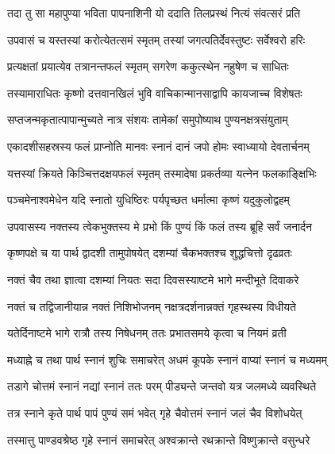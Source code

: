 \twolineshloka
{तदा तु सा महापुण्या भविता पापनाशिनी}
{यो ददाति तिलप्रस्थं नित्यं संवत्सरं प्रति}%

\twolineshloka
{उपवासं च यस्तस्यां करोत्येतत्समं स्मृतम्}
{तस्यां जगत्पतिर्देवस्तुष्टः सर्वेश्वरो हरिः}%

\twolineshloka
{प्रत्यक्षतां प्रयात्येव तत्रानन्तफलं स्मृतम्}
{सगरेण ककुत्स्थेन नहुषेण च साधितः}%

\twolineshloka
{तस्यामाराधितः कृष्णो दत्तवानखिलं भुवि}
{वाचिकान्मानसाद्वापि कायजाच्च विशेषतः}%

\twolineshloka
{सप्तजन्मकृतात्पापान्मुच्यते नात्र संशयः}
{तामेकां समुपोष्याथ पुण्यनक्षत्रसंयुताम्}%

\twolineshloka
{एकादशीसहस्रस्य फलं प्राप्नोति मानवः}
{स्नानं दानं जपो होमः स्वाध्यायो देवतार्चनम्}%

\twolineshloka
{यत्तस्यां क्रियते किञ्चित्तदक्षयफलं स्मृतम्}
{तस्मादेषा प्रकर्तव्या यत्नेन फलकाङ्क्षिभिः}%

\twolineshloka
{पञ्चमेनाश्वमेधेन यदि स्नातो युधिष्ठिरः}
{पर्यपृच्छत धर्मात्मा कृष्णं यदुकुलोद्वहम्}%


\twolineshloka
{उपवासस्य नक्तस्य त्वेकभुक्तस्य मे प्रभो}
{किं पुण्यं किं फलं तस्य ब्रूहि सर्वं जनार्दन}%


\twolineshloka
{कृष्णपक्षे च या पार्थ द्वादशी तामुपोषयेत्}
{दशम्यां चैकभक्तश्च शुद्धचित्तो दृढव्रतः}%

\twolineshloka
{नक्तं चैव तथा ज्ञात्वा दशम्यां नियतः सदा}
{दिवसस्याष्टमे भागे मन्दीभूते दिवाकरे}%

\twolineshloka
{नक्तं च तद्विजानीयान्न नक्तं निशिभोजनम्}
{नक्षत्रदर्शनान्नक्तं गृहस्थस्य विधीयते}%

\twolineshloka
{यतेर्दिनाष्टमे भागे रात्रौ तस्य निषेधनम्}
{ततः प्रभातसमये कृत्वा च नियमं व्रती}%

\twolineshloka
{मध्याह्ने च तथा पार्थ स्नानं शुचिः समाचरेत्}
{अधमं कूपके स्नानं वाप्यां स्नानं च मध्यमम्}%

\twolineshloka
{तडागे चोत्तमं स्नानं नद्यां स्नानं ततः परम्}
{पीड्यन्ते जन्तवो यत्र जलमध्ये व्यवस्थिते}%

\twolineshloka
{तत्र स्नाने कृते पार्थ पापं पुण्यं समं भवेत्}
{गृहे चैवोत्तमं स्नानं जलं चैव विशोधयेत्}%

\twolineshloka
{तस्मात्तु पाण्डवश्रेष्ठ गृहे स्नानं समाचरेत्}
{अश्वक्रान्ते रथक्रान्ते विष्णुक्रान्ते वसुन्धरे}%

